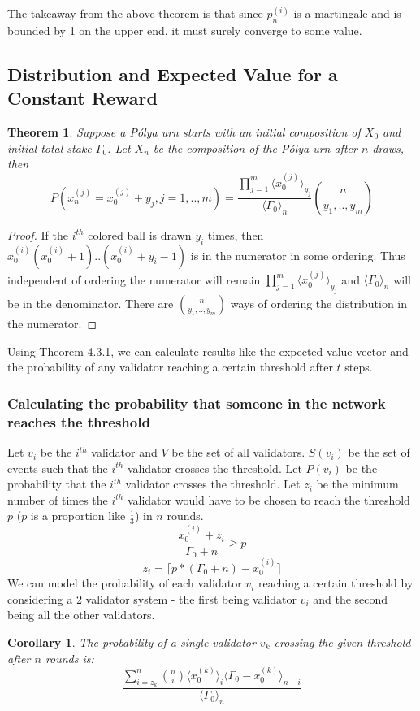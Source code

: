 \documentclass{article}
\newtheorem{theorem}{Theorem}[subsection]
\newtheorem{corollary}{Corollary}[theorem]
\renewcommand{\|}{\;|\;}
\begin{document}
The takeaway from the above theorem is that since $p_n^{(i)}$ is a martingale and is bounded by 1 on the upper end, it must surely converge to some value.
\subsection{Distribution and Expected Value for a Constant Reward}

\begin{theorem}
Suppose a P\'olya urn starts with an initial composition of $X_0$ and initial total stake $\Gamma_0$. Let $X_n$ be the composition of the P\'olya urn after $n$ draws, then
\begin{equation}
    P(x_n^{(j)} = x_0^{(j)} + y_j, j = 1,..,m) = \frac{\prod_{j=1}^m{\langle x_0^{(j)}\rangle_{y_j}}}{\langle \Gamma_0 \rangle_n} {n \choose y_1,..,y_m}
\end{equation}
\end{theorem}
\begin{proof}
If the $i^{th}$ colored ball is drawn $y_i$ times, then $x_0^{(i)}(x_0^{(i)} + 1) .. (x_0^{(i)} + y_i - 1)$ is in the numerator in some ordering. Thus independent of ordering the numerator will remain $\prod_{j=1}^m{\langle x_0^{(j)}\rangle_{y_j}}$ and $\langle \Gamma_0 \rangle_n$ will be in the denominator. There are ${n \choose y_1,..,y_m}$ ways of ordering the distribution in the numerator.
\end{proof}
\noindent Using Theorem 4.3.1, we can calculate results like the expected value vector and the probability of any validator reaching a certain threshold after $t$ steps.

\subsubsection{Calculating the probability that someone in the network reaches the threshold}
Let $v_i$ be the $i^{th}$ validator and $V$ be the set of all validators. $S(v_i)$ be the set of events such that the $i^{th}$ validator crosses the threshold. Let $P(v_i)$ be the probability that the $i^{th}$ validator crosses the threshold. Let $z_i$ be the minimum number of times the $i^{th}$ validator would have to be chosen to reach the threshold $p$ ($p$ is a proportion like $\frac{1}{3}$) in $n$ rounds. 
$$\frac{x_0^{(i)} + z_i}{\Gamma_0 + n} \geq p$$
\begin{equation}
z_i = \lceil p*(\Gamma_0 + n) - x_0^{(i)}\rceil
\end{equation}
We can model the probability of each validator $v_i$ reaching a certain threshold by considering a 2 validator system - the first being validator $v_i$ and the second being all the other validators. 
\begin{corollary}
    The probability of a single validator $v_k$ crossing the given threshold after $n$ rounds is:
\begin{equation}
    \frac{\sum_{i = z_k}^{n} \binom{n}{i} \langle x_0^{(k)} \rangle_i \langle \Gamma_0 - x_0^{(k)} \rangle_{n-i}}{\langle \Gamma_0 \rangle_n}
\end{equation}
\end{corollary}
\end{document}

